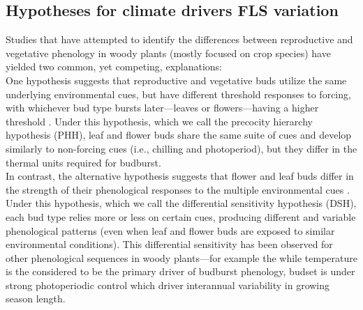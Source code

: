 \documentclass[11pt]{article}
\begin{document}
\subsection*{Hypotheses for climate drivers FLS variation} %
\noindent Studies that have attempted to identify the differences between reproductive and vegetative phenology in woody plants (mostly focused on crop species) have yielded two common, yet competing, explanations:\\

\noindent One hypothesis suggests that reproductive and vegetative buds utilize the same underlying environmental cues, but have different threshold responses to forcing, with whichever bud type bursts later---leaves or flowers---having a higher threshold \citep{Guo2014,COSMULESCU:2020aa,Cosmulescu:2018aa}. Under this hypothesis, which we call the precocity hierarchy hypothesis (PHH), leaf and flower buds share the same suite of cues and develop similarly to non-forcing cues (i.e., chilling and photoperiod), but they differ in the thermal units required for budburst.\\ %

\noindent In contrast, the alternative hypothesis suggests that flower and leaf buds differ in the strength of their phenological responses to the multiple environmental cues \citep{Citadin2001,Gariglio2006,Aslani2009,Mehlenbacher:1991aa}. Under this hypothesis, which we call the differential sensitivity hypothesis (DSH), each bud type relies more or less on certain cues, producing different and variable phenological patterns (even when leaf and flower buds are exposed to similar environmental conditions). This differential sensitivity has been observed for other phenological sequences in woody plants---for example the while temperature is the considered to be the primary driver of budburst phenology, budset is under strong photoperiodic control \citep{} which driver interannual variability in growing season length.\\ %
\end{document}
